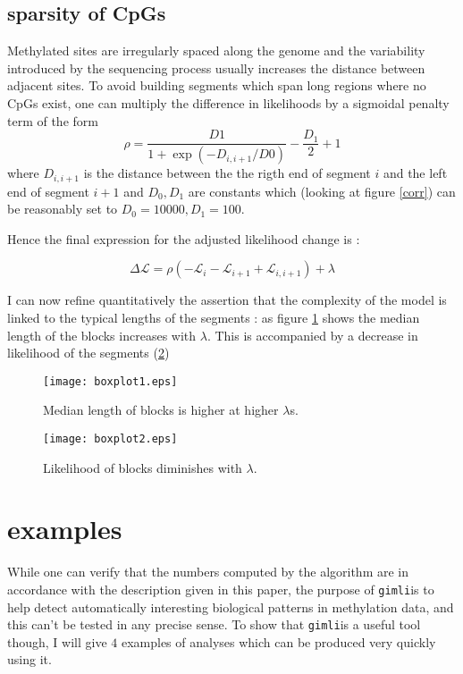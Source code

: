 \documentclass[11pt]{amsart}
\newcommand{\lik}{\ensuremath{\mathcal{L}}}
\newcommand{\gimli}{\texttt{gimli}}
\begin{document}
\subsection{sparsity of CpGs}

Methylated sites are irregularly spaced along the genome and the variability 
introduced by the sequencing process usually increases the distance 
between adjacent sites.
To avoid building segments which span long regions where no CpGs exist, one 
can multiply the difference in likelihoods by a sigmoidal penalty term of the
form \[\rho=\frac{D1}{1+\exp(-D_{i,i+1}/D0)}-\frac{D_1}{2}+1\] where $D_{i,i+1}$ is the distance 
between the the rigth end of segment $i$ and the left end of segment $i+1$ and 
$D_0,D_1$ are constants which (looking at figure \ref{corr}) can be reasonably 
set to $D_0=10000,D_1=100$. 

Hence the final expression for the adjusted likelihood change is :

\begin{equation}
\Delta \lik = \rho ( -\mathcal{L}_i-\mathcal{L}_{i+1}+\mathcal{L}_{i,i+1} )  +\lambda
\end{equation}

I can now refine quantitatively the assertion that the complexity of the model
is linked to the typical lengths of the segments : as figure \ref{boxplot1} 
shows the median length of the blocks increases with $\lambda$. This is 
accompanied by a decrease in likelihood of the segments (\ref{boxplot2})

\begin{figure}\label{boxplot1}
\texttt{[image: boxplot1.eps]}
\caption{Median length of blocks is higher at higher $\lambda$s.}
\end{figure}

\begin{figure}\label{boxplot2}
\texttt{[image: boxplot2.eps]}
\caption{Likelihood of blocks diminishes with $\lambda$.}
\end{figure}

\section{examples}

While one can verify that the numbers computed by the algorithm are in 
accordance with the description
given in this paper, the purpose of \gimli is to help 
detect automatically interesting
biological patterns in methylation data, and this can't be tested in any 
precise sense. To show that \gimli is a useful tool
though, I will give $4$ examples of analyses which can be produced very quickly
using it. 
\end{document}
